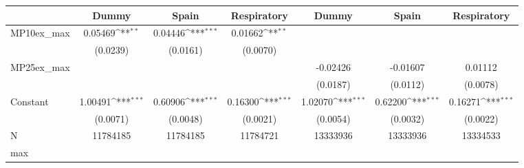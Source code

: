 {
\def\sym#1{\ifmmode^{#1}\else\(^{#1}\)\fi}
\begin{tabular}{l*{6}{c}}
\toprule
            &\multicolumn{1}{c}{Dummy}&\multicolumn{1}{c}{Spain}&\multicolumn{1}{c}{Respiratory}&\multicolumn{1}{c}{Dummy}&\multicolumn{1}{c}{Spain}&\multicolumn{1}{c}{Respiratory}\\
\midrule
MP10ex\_max  &     0.05469\sym{**} &     0.04446\sym{***}&     0.01662\sym{**} &                     &                     &                     \\
            &    (0.0239)         &    (0.0161)         &    (0.0070)         &                     &                     &                     \\
MP25ex\_max  &                     &                     &                     &    -0.02426         &    -0.01607         &     0.01112         \\
            &                     &                     &                     &    (0.0187)         &    (0.0112)         &    (0.0078)         \\
Constant    &     1.00491\sym{***}&     0.60906\sym{***}&     0.16300\sym{***}&     1.02070\sym{***}&     0.62200\sym{***}&     0.16271\sym{***}\\
            &    (0.0071)         &    (0.0048)         &    (0.0021)         &    (0.0054)         &    (0.0032)         &    (0.0022)         \\
\midrule
N           &    11784185         &    11784185         &    11784721         &    13333936         &    13333936         &    13334533         \\
max         &                     &                     &                     &                     &                     &                     \\
\bottomrule
\end{tabular}
}
